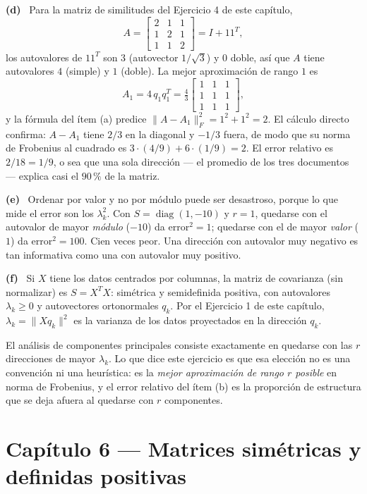 \documentclass[11pt,a4paper]{article}
\newcommand{\bi}[1]{\boldsymbol{#1}}
\newcommand{\n}[1]{\boldsymbol{#1}}
\DeclareMathOperator{\gen}{span}
\DeclareMathOperator{\tr}{tr}
\DeclareMathOperator{\rg}{rg}
\DeclareMathOperator{\diag}{diag}
\def\n#1{#1}\def\bi#1{#1}\def\rg{rg}\def\tr{tr}\def\gen{span}%
\newcounter{entrega}[section]
\newcommand{\itemsol}[1]{\par\medskip\noindent\textbf{(#1)}\ \ignorespaces}
\begin{document}
\itemsol{d} Para la matriz de similitudes del Ejercicio 4 de este capítulo,
\[
A=\begin{bmatrix}2&1&1\\ 1&2&1\\ 1&1&2\end{bmatrix}=I+\n1\n1^{T},
\]
los autovalores de $\n1\n1^T$ son $3$ (autovector $\n1/\sqrt3$) y $0$ doble, así
que $A$ tiene autovalores $4$ (simple) y $1$ (doble). La mejor aproximación de
rango $1$ es
\[
A_1=4\,q_1q_1^{T}=\tfrac43\begin{bmatrix}1&1&1\\ 1&1&1\\ 1&1&1\end{bmatrix},
\]
y la fórmula del ítem (a) predice $\|A-A_1\|_F^2=1^2+1^2=2$. El cálculo directo
confirma: $A-A_1$ tiene $2/3$ en la diagonal y $-1/3$ fuera, de modo que su norma
de Frobenius al cuadrado es $3\cdot(4/9)+6\cdot(1/9)=2$. El error relativo es
$2/18=1/9$, o sea que una sola dirección --- el promedio de los tres documentos
--- explica casi el $90\,\%$ de la matriz.

\itemsol{e} Ordenar por valor y no por módulo puede ser desastroso, porque lo que
mide el error son los $\lambda_k^2$. Con $S=\diag(1,-10)$ y $r=1$, quedarse con
el autovalor de mayor \emph{módulo} ($-10$) da error$^2=1$; quedarse con el de
mayor \emph{valor} ($1$) da error$^2=100$. Cien veces peor. Una dirección con
autovalor muy negativo es tan informativa como una con autovalor muy positivo.

\itemsol{f} Si $X$ tiene los datos centrados por columnas, la matriz de
covarianza (sin normalizar) es $S=X^TX$: simétrica y semidefinida positiva, con
autovalores $\lambda_k\ge0$ y autovectores ortonormales $q_k$. Por el Ejercicio 1
de este capítulo, $\lambda_k=\|Xq_k\|^2$ es la varianza de los datos proyectados
en la dirección $q_k$.

El análisis de componentes principales consiste exactamente en quedarse con las
$r$ direcciones de mayor $\lambda_k$. Lo que dice este ejercicio es que esa
elección no es una convención ni una heurística: es la \emph{mejor aproximación
de rango $r$ posible} en norma de Frobenius, y el error relativo del ítem (b) es
la proporción de estructura que se deja afuera al quedarse con $r$ componentes.


\clearpage
\section{Capítulo 6 --- Matrices simétricas y definidas positivas}
\setcounter{entrega}{0}
\end{document}

